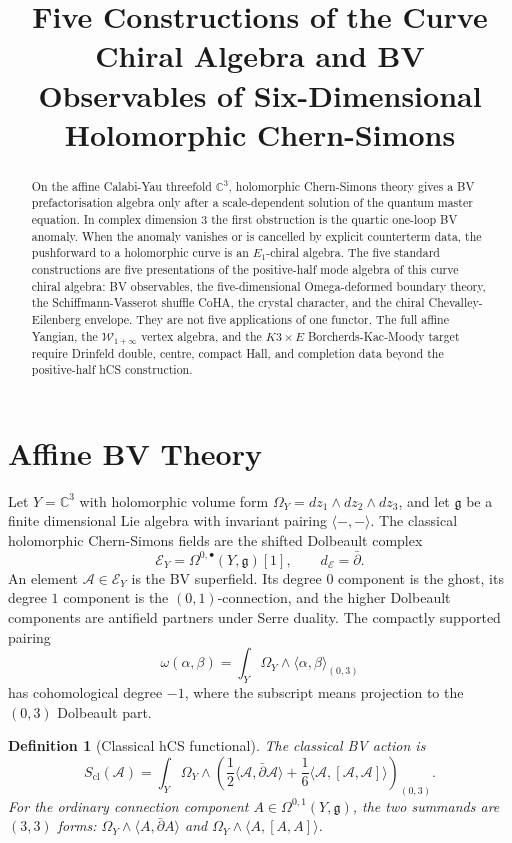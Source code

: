 \documentclass[11pt]{article}
\title{Five Constructions of the Curve Chiral Algebra and BV Observables of
Six-Dimensional Holomorphic Chern-Simons}
\author{}
\date{}
\newtheorem{definition}[theorem]{Definition}
\theoremstyle{remark}
\providecommand{\C}{\mathbb{C}}
\providecommand{\cW}{\mathcal{W}}
\providecommand{\frakg}{\mathfrak{g}}
\providecommand{\dbar}{\bar{\partial}}
\providecommand{\Ecal}{\mathcal{E}}
\providecommand{\Eone}{E_1}
\begin{document}
\maketitle

\begin{abstract}
On the affine Calabi-Yau threefold $\C^3$, holomorphic Chern-Simons
theory gives a BV prefactorisation algebra only after a scale-dependent
solution of the quantum master equation.  In complex dimension $3$ the
first obstruction is the quartic one-loop BV anomaly.  When the anomaly
vanishes or is cancelled by explicit counterterm data, the pushforward
to a holomorphic curve is an $\Eone$-chiral algebra.  The five standard
constructions are five presentations of the positive-half mode algebra
of this curve chiral algebra: BV observables, the five-dimensional
Omega-deformed boundary theory, the Schiffmann-Vasserot shuffle CoHA,
the crystal character, and the chiral Chevalley-Eilenberg envelope.
They are not five applications of one functor.  The full affine
Yangian, the $\cW_{1+\infty}$ vertex algebra, and the $K3\times E$
Borcherds-Kac-Moody target require Drinfeld double, centre, compact
Hall, and completion data beyond the positive-half hCS construction.
\end{abstract}

\section{Affine BV Theory}

Let $Y=\C^3$ with holomorphic volume form
$\Omega_Y=dz_1\wedge dz_2\wedge dz_3$, and let $\frakg$ be a finite
dimensional Lie algebra with invariant pairing $\langle-,-\rangle$.
The classical holomorphic Chern-Simons fields are the shifted
Dolbeault complex
\[
  \Ecal_Y=\Omega^{0,\bullet}(Y,\frakg)[1],
  \qquad d_{\Ecal}=\dbar .
\]
An element $\mathcal A\in\Ecal_Y$ is the BV superfield.  Its degree
$0$ component is the ghost, its degree $1$ component is the
$(0,1)$-connection, and the higher Dolbeault components are antifield
partners under Serre duality.  The compactly supported pairing
\[
  \omega(\alpha,\beta)
  =
  \int_Y\Omega_Y\wedge\langle \alpha,\beta\rangle_{(0,3)}
\]
has cohomological degree $-1$, where the subscript means projection to
the $(0,3)$ Dolbeault part.

\begin{definition}[Classical hCS functional]
The classical BV action is
\[
  S_{\mathrm{cl}}(\mathcal A)
  =
  \int_Y\Omega_Y\wedge
  \left(
    \frac12\langle \mathcal A,\dbar\mathcal A\rangle
    +\frac16\langle \mathcal A,[\mathcal A,\mathcal A]\rangle
  \right)_{(0,3)} .
  \label{eq:hcs-classical-action}
\]
For the ordinary connection component $A\in\Omega^{0,1}(Y,\frakg)$,
the two summands are $(3,3)$ forms:
$\Omega_Y\wedge\langle A,\dbar A\rangle$ and
$\Omega_Y\wedge\langle A,[A,A]\rangle$.
\end{definition}
\end{document}
